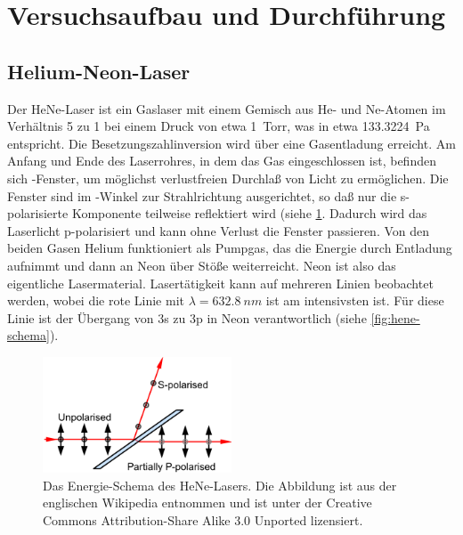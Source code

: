 \section{Versuchsaufbau und Durchführung}

\subsection{Helium-Neon-Laser}
Der HeNe-Laser ist ein Gaslaser mit einem Gemisch aus He- und Ne-Atomen
im Verhältnis 5 zu 1 bei einem Druck von etwa \SI{1}{Torr}, was in etwa
\SI{133.3224}{Pa} entspricht.  Die Besetzungszahlinversion wird über
eine Gasentladung erreicht.  Am Anfang und Ende des Laserrohres, in dem
das Gas eingeschlossen ist, befinden sich -Fenster, um
möglichst verlustfreien Durchlaß von Licht zu ermöglichen.  Die Fenster
sind im -Winkel zur Strahlrichtung ausgerichtet, so daß
nur die s-polarisierte Komponente teilweise reflektiert wird (siehe
\cref{fig:brewster-window}.  Dadurch wird das Laserlicht p-polarisiert
und kann ohne Verlust die Fenster passieren. Von den beiden Gasen Helium
funktioniert als Pumpgas, das die Energie durch Entladung aufnimmt und
dann an Neon über Stöße weiterreicht.  Neon ist also das eigentliche
Lasermaterial.  Lasertätigkeit kann auf mehreren Linien beobachtet
werden, wobei die rote Linie mit $\lambda = \SI{632.8}{nm}$ ist am
intensivsten ist.  Für diese Linie ist der Übergang von 3s zu 3p in Neon
verantwortlich (siehe \cref{fig:hene-schema}).

\begin{figure}
  \centering
  \includegraphics[width=0.5\textwidth]{figures/Brewster_window}
  \caption{Das Energie-Schema des HeNe-Lasers.  Die Abbildung ist aus
    der englischen Wikipedia entnommen \cite{wikipedia:brewster_angle}
    und ist unter der Creative Commons Attribution-Share Alike 3.0
    Unported lizensiert.}
  \label{fig:brewster-window}
\end{figure}

